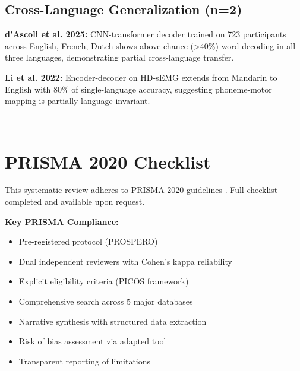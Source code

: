 \subsection{Cross-Language Generalization (n=2)}

\textbf{d'Ascoli et al. 2025:} CNN-transformer decoder trained on 723 participants across English, French, Dutch shows above-chance (>40\%) word decoding in all three languages, demonstrating partial cross-language transfer.

\textbf{Li et al. 2022:} Encoder-decoder on HD-sEMG extends from Mandarin to English with 80\% of single-language accuracy, suggesting phoneme-motor mapping is partially language-invariant.

 - 

\section{PRISMA 2020 Checklist}
\label{app:prisma_checklist}

This systematic review adheres to PRISMA 2020 guidelines \cite{Page2021}. Full checklist completed and available upon request.

\textbf{Key PRISMA Compliance:}
\begin{itemize}
    \item Pre-registered protocol (PROSPERO)
    \item Dual independent reviewers with Cohen's kappa reliability
    \item Explicit eligibility criteria (PICOS framework)
    \item Comprehensive search across 5 major databases
    \item Narrative synthesis with structured data extraction
    \item Risk of bias assessment via adapted tool
    \item Transparent reporting of limitations
\end{itemize}

